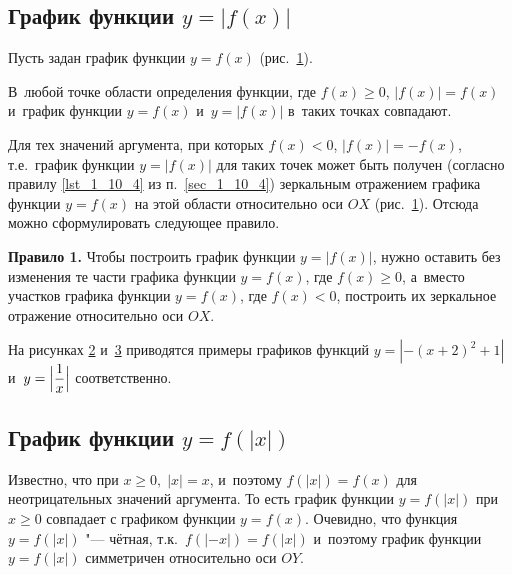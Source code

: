 \subsection{График функции $y = |f(x)|$}

Пусть задан график функции $y = f(x)$ (рис.\ \ref{fig_1_12_35}).

\begin{figure}\label{fig_1_12_35}
\end{figure}

В~любой точке области определения функции,
где $f(x) \geqslant 0$, $|f(x)| = f(x)$
и~график функции $y = f(x)$ и~$y = |f(x)|$
в~таких точках совпадают.

Для тех значений аргумента, при которых $f(x) < 0$,
$|f(x)| = -f(x)$, т.е.\ график функции $y = |f(x)|$
для таких точек может быть получен (согласно правилу \ref{lst_1_10_4}
из п.~\ref{sec_1_10_4}) зеркальным отражением графика функции $y = f(x)$
на этой области относительно оси $OX$ (рис.\ \ref{fig_1_12_35}).
Отсюда можно сформулировать следующее правило.

\textbf{Правило 1.} Чтобы построить график функции $y = |f(x)|$,
нужно оставить без изменения те части графика функции $y = f(x)$,
где $f(x) \geqslant 0$, а~вместо участков графика функции $y = f(x)$,
где $f(x) < 0$, построить их зеркальное отражение относительно оси $OX$.

\begin{figure}
\end{figure}

На рисунках \ref{fig_1_12_36} и~\ref{fig_1_12_37} приводятся примеры графиков функций
$y = |-(x + 2)^{2} + 1|$ и~$\displaystyle y = \Bigl|\frac{1}{x}\Bigr|$
соответственно.

\begin{figure}\label{fig_1_12_36}
\end{figure}

\begin{figure}\label{fig_1_12_37}
\end{figure}


\subsection{График функции $y = f(|x|)$}

Известно, что при $x \geqslant 0, \; |x| = x$,
и~поэтому $f(|x|) = f(x)$ для неотрицательных значений аргумента.
То есть график функции $y = f(|x|)$ при $x \geqslant 0$ совпадает с графиком
функции $y = f(x)$.
Очевидно, что функция $y = f(|x|)$ "--- чётная, т.к.\ $f(|-x|) = f(|x|)$
и~поэтому график функции $y = f(|x|)$ симметричен относительно оси $OY$.

